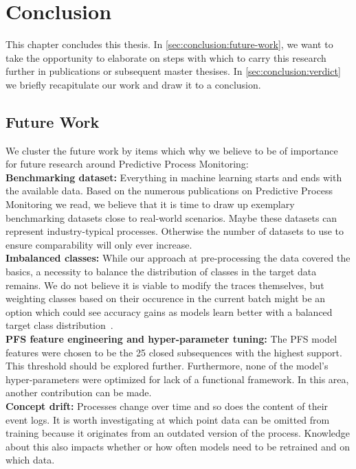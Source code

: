 \chapter{Conclusion} \label{chap:conclusion}
This chapter concludes this thesis. In \autoref{sec:conclusion:future-work}, we want to take the opportunity to elaborate on steps with which to carry this research further in publications or subsequent master thesises. In \autoref{sec:conclusion:verdict} we briefly recapitulate our work and draw it to a conclusion.

\section{Future Work} \label{sec:conclusion:future-work}
We cluster the future work by items which why we believe to be of importance for future research around Predictive Process Monitoring:\\

\noindent\textbf{Benchmarking dataset:} Everything in machine learning starts and ends with the available data. Based on the numerous publications on Predictive Process Monitoring we read, we believe that it is time to draw up exemplary benchmarking datasets close to real-world scenarios. Maybe these datasets can represent industry-typical processes. Otherwise the number of datasets to use to ensure comparability will only ever increase.\\

\noindent\textbf{Imbalanced classes:} While our approach at pre-processing the data covered the basics, a necessity to balance the distribution of classes in the target data remains. We do not believe it is viable to modify the traces themselves, but weighting classes based on their occurence in the current batch might be an option which could see accuracy gains as models learn better with a balanced target class distribution~\cite{web:stackoverflow-keras-class-weights}.\\

\noindent\textbf{PFS feature engineering and hyper-parameter tuning:} The PFS model features  were chosen to be the 25 closed subsequences with the highest support. This threshold should be explored further. Furthermore, none of the model's hyper-parameters were optimized for lack of a functional framework. In this area, another contribution can be made.\\

\noindent\textbf{Concept drift:} Processes change over time and so does the content of their event logs. It is worth investigating at which point data can be omitted from training because it originates from an outdated version of the process. Knowledge about this also impacts whether or how often models need to be retrained and on which data.\\

